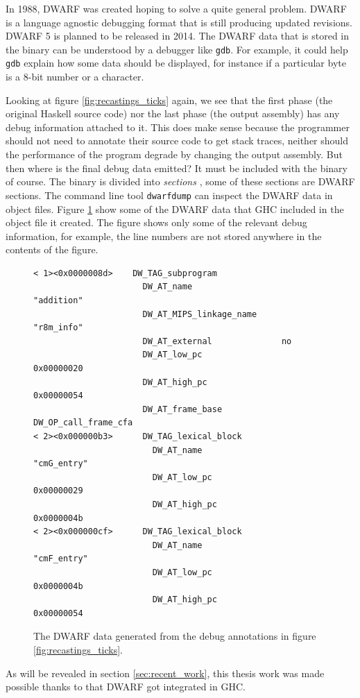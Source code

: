 In 1988, DWARF was created hoping to solve a quite general problem. DWARF is
a language agnostic debugging format that is still producing updated revisions.
DWARF 5 is planned to be released in 2014. \cite{eager2012introduction} The DWARF data that is
stored in the binary can be understood by a debugger like \texttt{gdb}. For example,
it could help \texttt{gdb} explain how some data should be displayed, for instance if a
particular byte is a 8-bit number or a character.

Looking at figure \ref{fig:recastings_ticks} again, we see that
the first phase (the original Haskell source code) nor the last
phase (the output assembly) has any debug information attached to
it. This does make sense because the programmer should not need to
annotate their source code to get stack traces, neither should the
performance of the program degrade by changing the output assembly.
But then where is the final debug data emitted? It must be included
with the binary of course. The binary is divided into \emph{sections}
\cite{oracle_object_file_format}, some of these sections are DWARF
sections. The command line tool \texttt{dwarfdump} can inspect the
DWARF data in object files. Figure \ref{fig:dwarfdump} show some of the
DWARF data that GHC included in the object file it created. The figure
shows only some of the relevant debug information, for example, the line
numbers are not stored anywhere in the contents of the figure.

\begin{figure}
\begin{mdframed}
  \begin{verbatim}
< 1><0x0000008d>    DW_TAG_subprogram
                      DW_AT_name                  "addition"
                      DW_AT_MIPS_linkage_name     "r8m_info"
                      DW_AT_external              no
                      DW_AT_low_pc                0x00000020
                      DW_AT_high_pc               0x00000054
                      DW_AT_frame_base            DW_OP_call_frame_cfa
< 2><0x000000b3>      DW_TAG_lexical_block
                        DW_AT_name                  "cmG_entry"
                        DW_AT_low_pc                0x00000029
                        DW_AT_high_pc               0x0000004b
< 2><0x000000cf>      DW_TAG_lexical_block
                        DW_AT_name                  "cmF_entry"
                        DW_AT_low_pc                0x0000004b
                        DW_AT_high_pc               0x00000054
  \end{verbatim}
  \caption{The DWARF data generated from the debug annotations in figure
    \ref{fig:recastings_ticks}.}
  \label{fig:dwarfdump}
\end{mdframed}
\end{figure}

As will be revealed in
section \ref{sec:recent_work}, this thesis work was made possible thanks
to that DWARF got integrated in GHC.
